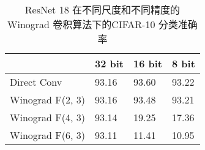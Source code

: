 \begin{table}[]
\label{tbl:winograd_acc}
\caption{ResNet 18 在不同尺度和不同精度的Winograd 卷积算法下的CIFAR-10 分类准确率}
\begin{tabular}{llll}
\hline
\multicolumn{1}{|l|}{}                 & \multicolumn{1}{l|}{32 bit} & \multicolumn{1}{l|}{16 bit} & \multicolumn{1}{l|}{8 bit} \\ \hline
\multicolumn{1}{|l|}{Direct  Conv}     & \multicolumn{1}{l|}{93.16}  & \multicolumn{1}{l|}{93.60}  & \multicolumn{1}{l|}{93.22} \\ \hline
\multicolumn{1}{|l|}{Winograd F(2, 3)} & \multicolumn{1}{l|}{93.16}  & \multicolumn{1}{l|}{93.48}  & \multicolumn{1}{l|}{93.21} \\ \hline
\multicolumn{1}{|l|}{Winograd F(4, 3)} & \multicolumn{1}{l|}{93.14}  & \multicolumn{1}{l|}{19.25}  & \multicolumn{1}{l|}{17.36} \\ \hline
Winograd F(6, 3)                       & 93.11                       & 11.41                       & 10.95                     
\end{tabular}
\end{table}

